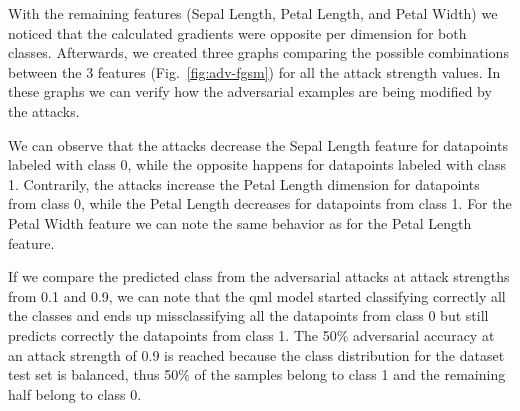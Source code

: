 With the remaining features (Sepal Length, Petal Length, and Petal Width)
we noticed that the calculated gradients were opposite per dimension for
both classes. Afterwards, we created three graphs comparing the possible
combinations between the 3 features (Fig.~\ref{fig:adv-fgsm}) for all
the attack strength values. In these graphs we can verify how the
adversarial examples are being modified by the attacks. \

We can observe that the attacks decrease the Sepal Length feature
for datapoints labeled with class 0, while the opposite happens
for datapoints labeled with class 1. Contrarily, the attacks
increase the Petal Length dimension for datapoints from class 0,
while the Petal Length decreases for datapoints from class 1. For
the Petal Width feature we can note the same behavior as for the
Petal Length feature. \

If we compare the predicted class from the adversarial attacks
at attack strengths from 0.1 and 0.9, we can note that the \ac{qml}
model started classifying correctly all the classes and ends up
missclassifying all the datapoints from class 0 but still
predicts correctly the datapoints from class 1. The 50\% adversarial
accuracy at an attack strength of 0.9 is reached because the class
distribution for the dataset test set is balanced, thus 50\% of
the samples belong to class 1 and the remaining half belong to
class 0. \

